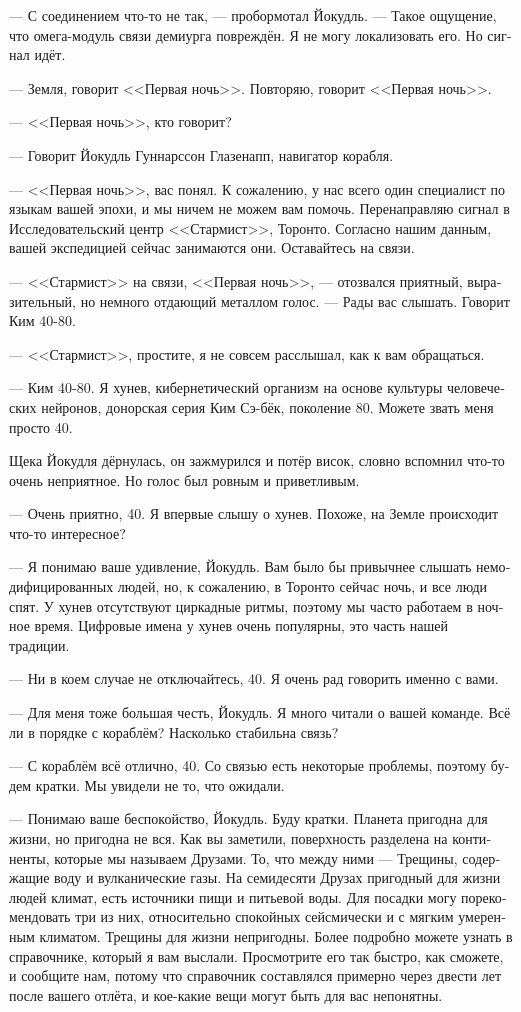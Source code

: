 \documentclass[a4paper,12pt,fleqn]{book}\usepackage{cooltooltips}\usepackage{polyglossia}\setdefaultlanguage[babelshorthands=true]{russian}\setotherlanguage{english}\defaultfontfeatures{Ligatures=TeX,Mapping=tex-text} \usepackage{xcolor}\definecolor{lightgray}{HTML}{bbbbbb}\color{lightgray}\newcommand{\ml}[3]{\textenglish{\textcolor{black}{#3}}}
\newcommand{\asterism}{\vspace{1em}{\centering\Large\bfseries$\ast~\ast~\ast$\par}\vspace{1em}}
\begin{document}
--- С соединением что-то не так, --- пробормотал Йокудль.
--- Такое ощущение, что омега-модуль связи демиурга повреждён.
Я не могу локализовать его.
Но сигнал идёт.

\asterism

--- Земля, говорит <<Первая ночь>>.
Повторяю, говорит <<Первая ночь>>.

--- <<Первая ночь>>, кто говорит?

--- Говорит Йокудль Гуннарссон Глазенапп, навигатор корабля.

--- <<Первая ночь>>, вас понял.
К сожалению, у нас всего один специалист по языкам вашей эпохи, и мы ничем не можем вам помочь.
Перенаправляю сигнал в Исследовательский центр <<Стармист>>, Торонто.
Согласно нашим данным, вашей экспедицией сейчас занимаются они.
Оставайтесь на связи.

--- <<Стармист>> на связи, <<Первая ночь>>, --- отозвался приятный, выразительный, но немного отдающий металлом голос.
--- Рады вас слышать.
Говорит Ким 40-80.

--- <<Стармист>>, простите, я не совсем расслышал, как к вам обращаться.

--- Ким 40-80.
Я хунев, кибернетический организм на основе культуры человеческих нейронов, донорская серия Ким Сэ-бёк, поколение 80. %
Можете звать меня просто 40.

Щека Йокудля дёрнулась, он зажмурился и потёр висок, словно вспомнил что-то очень неприятное.
Но голос был ровным и приветливым.

--- Очень приятно, 40.
Я впервые слышу о хунев.
Похоже, на Земле происходит что-то интересное?

--- Я понимаю ваше удивление, Йокудль.
Вам было бы привычнее слышать немодифицированных людей, но, к сожалению, в Торонто сейчас ночь, и все люди спят.
У хунев отсутствуют циркадные ритмы, поэтому мы часто работаем в ночное время.
Цифровые имена у хунев очень популярны, это часть нашей традиции.

--- Ни в коем случае не отключайтесь, 40.
Я очень рад говорить именно с вами.

--- Для меня тоже большая честь, Йокудль.
Я много читали о вашей команде.
Всё ли в порядке с кораблём?
Насколько стабильна связь?

--- С кораблём всё отлично, 40.
Со связью есть некоторые проблемы, поэтому будем кратки.
Мы увидели не то, что ожидали.

--- Понимаю ваше беспокойство, Йокудль.
Буду кратки.
Планета пригодна для жизни, но пригодна не вся.
Как вы заметили, поверхность разделена на континенты, которые мы называем Друзами.
То, что между ними --- Трещины, содержащие воду и вулканические газы.
На семидесяти Друзах пригодный для жизни людей климат, есть источники пищи и питьевой воды.
Для посадки могу порекомендовать три из них, относительно спокойных сейсмически и с мягким умеренным климатом.
Трещины для жизни непригодны.
Более подробно можете узнать в справочнике, который я вам выслали.
Просмотрите его так быстро, как сможете, и сообщите нам, потому что справочник составлялся примерно через двести лет после вашего отлёта, и кое-какие вещи могут быть для вас непонятны.
\end{document}

